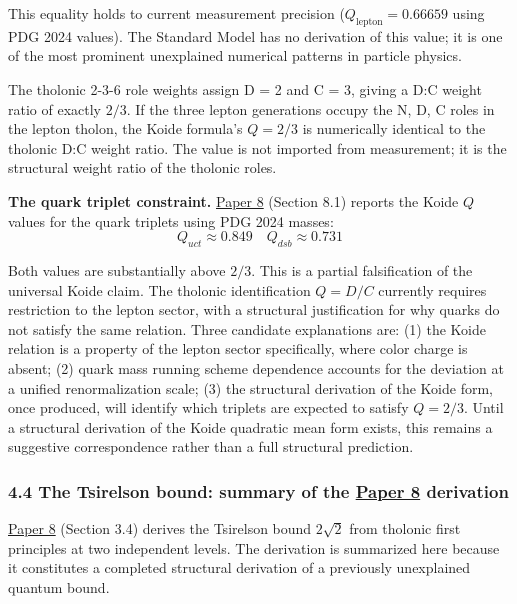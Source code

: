 \documentclass[
  11pt,
  letterpaper,
]{article}
\begin{document}
This equality holds to current measurement precision
(\(Q_{\text{lepton}} = 0.66659\) using PDG 2024 values). The Standard
Model has no derivation of this value; it is one of the most prominent
unexplained numerical patterns in particle physics.

The tholonic 2-3-6 role weights assign D = 2 and C = 3, giving a D:C
weight ratio of exactly \(2/3\). If the three lepton generations occupy
the N, D, C roles in the lepton tholon, the Koide formula's \(Q = 2/3\)
is numerically identical to the tholonic D:C weight ratio. The value is
not imported from measurement; it is the structural weight ratio of the
tholonic roles.

\textbf{The quark triplet constraint.}
\href{https://github.com/baardev/truevalue/blob/main/docnav/Research/papers/8_atom-as-tholon-measurable-phenomena/8_atom-as-tholon-measurable-phenomena.pdf}{Paper
8} (Section 8.1) reports the Koide \(Q\) values for the quark triplets
using PDG 2024 masses:
\[Q_{uct} \approx 0.849 \quad Q_{dsb} \approx 0.731\]

Both values are substantially above \(2/3\). This is a partial
falsification of the universal Koide claim. The tholonic identification
\(Q = D/C\) currently requires restriction to the lepton sector, with a
structural justification for why quarks do not satisfy the same
relation. Three candidate explanations are: (1) the Koide relation is a
property of the lepton sector specifically, where color charge is
absent; (2) quark mass running scheme dependence accounts for the
deviation at a unified renormalization scale; (3) the structural
derivation of the Koide form, once produced, will identify which
triplets are expected to satisfy \(Q = 2/3\). Until a structural
derivation of the Koide quadratic mean form exists, this remains a
suggestive correspondence rather than a full structural prediction.

\subsubsection{\texorpdfstring{4.4 The Tsirelson bound: summary of the
\href{https://github.com/baardev/truevalue/blob/main/docnav/Research/papers/8_atom-as-tholon-measurable-phenomena/8_atom-as-tholon-measurable-phenomena.pdf}{Paper
8}
derivation}{4.4 The Tsirelson bound: summary of the Paper 8 derivation}}\label{the-tsirelson-bound-summary-of-the-paper-8-derivation}

\href{https://github.com/baardev/truevalue/blob/main/docnav/Research/papers/8_atom-as-tholon-measurable-phenomena/8_atom-as-tholon-measurable-phenomena.pdf}{Paper
8} (Section 3.4) derives the Tsirelson bound \(2\sqrt{2}\) from tholonic
first principles at two independent levels. The derivation is summarized
here because it constitutes a completed structural derivation of a
previously unexplained quantum bound.
\end{document}
